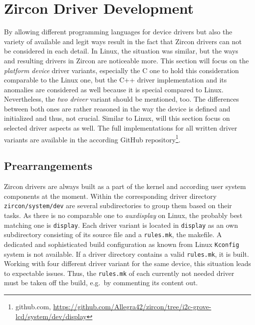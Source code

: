 
\section{Zircon Driver Development}\label{sec:cs-zircon}
By allowing different programming languages for device drivers but also the variety of available and legit ways result in the fact that Zircon drivers can not be considered in each detail.
In Linux, the situation was similar, but the ways and resulting drivers in Zircon are noticeable more.
This section will focus on the \textit{platform device} driver variants, especially the C one to hold this consideration comparable to the Linux one, but the C++ driver implementation and its anomalies are considered as well because it is special compared to Linux.
Nevertheless, the \textit{two driver} variant should be mentioned, too.
The differences between both ones are rather reasoned in the way the device is defined and initialized and thus, not crucial.
Similar to Linux, will this section focus on selected driver aspects as well.
The full implementations for all written driver variants are available in the according GitHub repository\footnote{github.com, \url{https://github.com/Allegra42/zircon/tree/i2c-grove-lcd/system/dev/display}}.

\subsection{Prearrangements}
Zircon drivers are always built as a part of the kernel and according user system components at the moment.
Within the corresponding driver directory \texttt{zircon/system/dev} are several subdirectories to group them based on their tasks.
As there is no comparable one to \textit{auxdisplay} on Linux, the probably best matching one is \texttt{display}.
Each driver variant is located in \texttt{display} as an own subdirectory consisting of its source file and a \texttt{rules.mk}, the makefile.
A dedicated and sophisticated build configuration as known from Linux \texttt{Kconfig} system is not available.
If a driver directory contains a valid \texttt{rules.mk}, it is built.
Working with four different driver variant for the same device, this situation leads to expectable issues.
Thus, the \texttt{rules.mk} of each currently not needed driver must be taken off the build, e.g.\ by commenting its content out.

